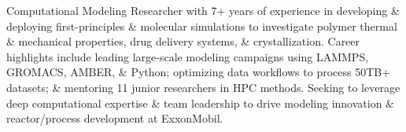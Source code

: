 \documentclass[letterpaper,12pt]{article}
\begin{document}
\vspace{-0.25cm}
Computational Modeling Researcher with 7+ years of experience in developing \& deploying first-principles \& molecular simulations to investigate polymer thermal \& mechanical properties, drug delivery systems, \& crystallization.
Career highlights include leading large-scale modeling campaigns using LAMMPS, GROMACS, AMBER, \& Python; optimizing data workflows to process 50TB+ datasets; \& mentoring 11 junior researchers in HPC methods.
Seeking to leverage deep computational expertise \& team leadership to drive modeling innovation \& reactor/process development at ExxonMobil.


\vspace{-1.2\baselineskip}
\end{document}
